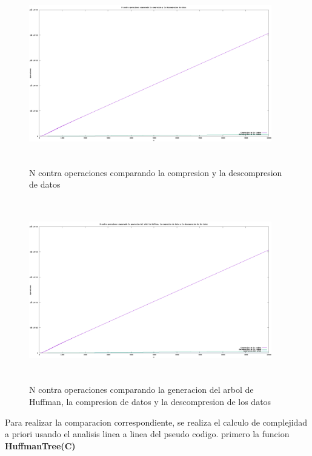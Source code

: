 \documentclass[spanish]{article}
\begin{document}
	\begin{figure}[H]
		\centering
		\includegraphics[width=400px,height=300px]{grafica9}
		\caption{N contra operaciones comparando la compresion y la descompresion de datos}
	\end{figure}
	\begin{figure}[H]
		\centering
		\includegraphics[width=400px,height=300px]{grafica10}
		\caption{N contra operaciones comparando la generacion del arbol de Huffman, la compresion de datos y la descompresion de los datos}
	\end{figure}
	Para realizar la comparacion correspondiente, se realiza el calculo de complejidad a priori usando el analisis linea a linea del pseudo codigo.
	primero la funcion \textbf{HuffmanTree(C)}
\end{document}
